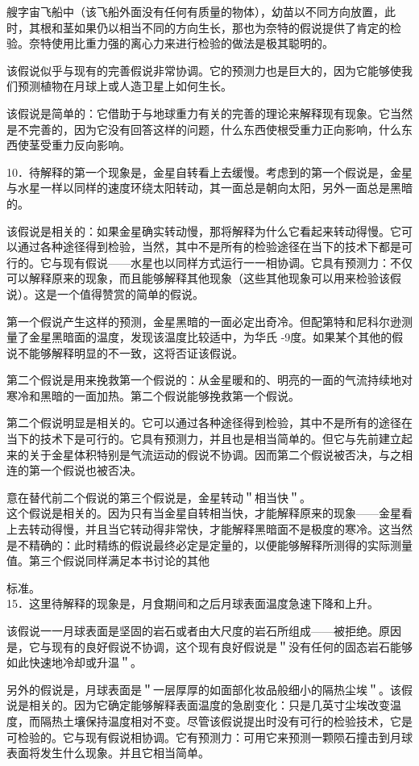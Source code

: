 艘字宙飞船中（该飞船外面没有任何有质量的物体），幼苗以不同方向放置，此时，其根和茎如果仍以相当不同的方向生长，那也为奈特的假说提供了肯定的检验。奈特使用比重力强的离心力来进行检验的做法是极其聪明的。

该假说似乎与现有的完善假说非常协调。它的预测力也是巨大的，因为它能够使我们预测植物在月球上或人造卫星上如何生长。

该假说是简单的：它借助于与地球重力有关的完善的理论来解释现有现象。它当然是不完善的，因为它没有回答这样的问题，什么东西使根受重力正向影响，什么东西使茎受重力反向影响。

10．待解释的第一个现象是，金星自转看上去缓慢。考虑到的第一个假说是，金星与水星一样以同样的速度环绕太阳转动，其一面总是朝向太阳，另外一面总是黑暗的。

该假说是相关的：如果金星确实转动慢，那将解释为什么它看起来转动得慢。它可以通过各种途径得到检验，当然，其中不是所有的检验途径在当下的技术下都是可行的。它与现有假说——水星也以同样方式运行一一相协调。它具有预测力：不仅可以解释原来的现象，而且能够解释其他现象（这些其他现象可以用来检验该假说）。这是一个值得赞赏的简单的假说。

第一个假说产生这样的预测，金星黑暗的一面必定出奇冷。但配第特和尼科尔逊测量了金星黑暗面的温度，发现该温度比较适中，为华氏 -9度。如果某个其他的假说不能够解释明显的不一致，这将否证该假说。

第二个假说是用来挽救第一个假说的：从金星暖和的、明亮的一面的气流持续地对寒冷和黑暗的一面加热。第二个假说能够挽救第一个假说。

第二个假说明显是相关的。它可以通过各种途径得到检验，其中不是所有的途径在当下的技术下是可行的。它具有预测力，并且也是相当简单的。但它与先前建立起来的关于金星体积特别是气流运动的假说不协调。因而第二个假说被否决，与之相连的第一个假说也被否决。

意在替代前二个假说的第三个假说是，金星转动＂相当快＂。\\
这个假说是相关的。因为只有当金星自转相当快，才能解释原来的现象——金星看上去转动得慢，并且当它转动得非常快，才能解释黑暗面不是极度的寒冷。这当然是不精确的：此时精练的假说最终必定是定量的，以便能够解释所测得的实际测量值。第三个假说同样满足本书讨论的其他

标准。\\
15．这里待解释的现象是，月食期间和之后月球表面温度急速下降和上升。

该假说一一月球表面是坚固的岩石或者由大尺度的岩石所组成——被拒绝。原因是，它与现有的良好假说不协调，这个现有良好假说是＂没有任何的固态岩石能够如此快速地冷却或升温＂。

另外的假说是，月球表面是＂一层厚厚的如面部化妆品般细小的隔热尘埃＂。该假说是相关的。因为它确定能够解释表面温度的急剧变化：只是几英寸尘埃改变温度，而隔热土壤保持温度相对不变。尽管该假说提出时没有可行的检验技术，它是可检验的。它与现有假说相协调。它有预测力：可用它来预测一颗陨石撞击到月球表面将发生什么现象。并且它相当简单。

